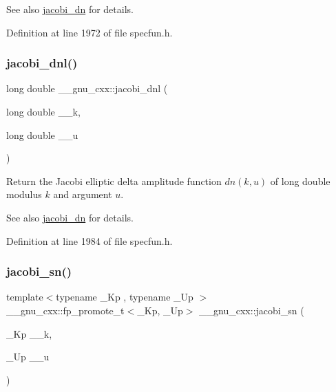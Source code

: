 \begin{DoxySeeAlso}{See also}
\hyperlink{group__gnu__math__spec__func_ga0f8fa8d6a77dbc2089d65f3f16876aa9}{jacobi\+\_\+dn} for details. 
\end{DoxySeeAlso}


Definition at line 1972 of file specfun.\+h.

\mbox{\label{group__gnu__math__spec__func_gae59786991abbf8359deef49b6323065a}} 
\subsubsection{\texorpdfstring{jacobi\+\_\+dnl()}{jacobi\_dnl()}}
{\footnotesize\ttfamily long double \+\_\+\+\_\+gnu\+\_\+cxx\+::jacobi\+\_\+dnl (\begin{DoxyParamCaption}\item[{long double}]{\+\_\+\+\_\+k,  }\item[{long double}]{\+\_\+\+\_\+u }\end{DoxyParamCaption})\hspace{0.3cm}{\ttfamily [inline]}}

Return the Jacobi elliptic delta amplitude function $ dn(k,u) $ of {\ttfamily long double} modulus $ k $ and argument $ u $.

\begin{DoxySeeAlso}{See also}
\hyperlink{group__gnu__math__spec__func_ga0f8fa8d6a77dbc2089d65f3f16876aa9}{jacobi\+\_\+dn} for details. 
\end{DoxySeeAlso}


Definition at line 1984 of file specfun.\+h.

\mbox{\label{group__gnu__math__spec__func_ga49d5e18152dd0dd0f496b8c8582e7045}} 
\subsubsection{\texorpdfstring{jacobi\+\_\+sn()}{jacobi\_sn()}}
{\footnotesize\ttfamily template$<$typename \+\_\+\+Kp , typename \+\_\+\+Up $>$ \\
\+\_\+\+\_\+gnu\+\_\+cxx\+::fp\+\_\+promote\+\_\+t$<$\+\_\+\+Kp, \+\_\+\+Up$>$ \+\_\+\+\_\+gnu\+\_\+cxx\+::jacobi\+\_\+sn (\begin{DoxyParamCaption}\item[{\+\_\+\+Kp}]{\+\_\+\+\_\+k,  }\item[{\+\_\+\+Up}]{\+\_\+\+\_\+u }\end{DoxyParamCaption})\hspace{0.3cm}{\ttfamily [inline]}}

